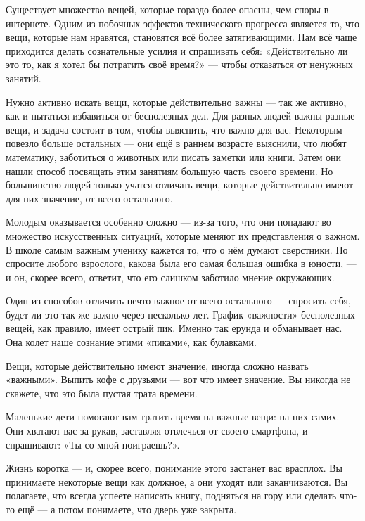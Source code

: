 \documentclass[ebook,12pt,oneside,openany]{memoir}
\begin{document}
Существует множество вещей, которые гораздо более опасны, чем споры в
интернете. Одним из побочных эффектов технического прогресса является
то, что вещи, которые нам нравятся, становятся всё более
затягивающими. Нам всё чаще приходится делать сознательные усилия и
спрашивать себя: «Действительно ли это то, как я хотел бы потратить
своё время?» — чтобы отказаться от ненужных занятий. \newline

Нужно активно искать вещи, которые действительно важны — так же
активно, как и пытаться избавиться от бесполезных дел. Для разных
людей важны разные вещи, и задача состоит в том, чтобы выяснить, что
важно для вас. Некоторым повезло больше остальных — они ещё в раннем
возрасте выяснили, что любят математику, заботиться о животных или
писать заметки или книги. Затем они нашли способ посвящать этим
занятиям большую часть своего времени. Но большинство людей только
учатся отличать вещи, которые действительно имеют для них значение, от
всего остального. \newline

Молодым оказывается особенно сложно — из-за того, что они попадают во
множество искусственных ситуаций, которые меняют их представления о
важном. В школе самым важным ученику кажется то, что о нём думают
сверстники. Но спросите любого взрослого, какова была его самая
большая ошибка в юности, — и он, скорее всего, ответит, что его
слишком заботило мнение окружающих. \newline

Один из способов отличить нечто важное от всего остального — спросить
себя, будет ли это так же важно через несколько лет. График «важности»
бесполезных вещей, как правило, имеет острый пик. Именно так ерунда и
обманывает нас. Она колет наше сознание этими «пиками», как булавками. \newline

Вещи, которые действительно имеют значение, иногда сложно назвать
«важными». Выпить кофе с друзьями — вот что имеет значение. Вы никогда
не скажете, что это была пустая трата времени. \newline

Маленькие дети помогают вам тратить время на важные вещи: на них
самих. Они хватают вас за рукав, заставляя отвлечься от своего
смартфона, и спрашивают: «Ты со мной поиграешь?». \newline

Жизнь коротка — и, скорее всего, понимание этого застанет вас
врасплох. Вы принимаете некоторые вещи как должное, а они уходят или
заканчиваются. Вы полагаете, что всегда успеете написать книгу,
подняться на гору или сделать что-то ещё — а потом понимаете, что
дверь уже закрыта. \newline
\end{document}
